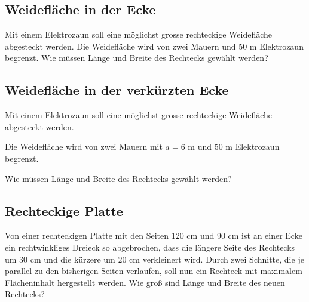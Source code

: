 
\subsection{Weidefläche in der Ecke}

Mit einem Elektrozaun soll eine möglichst grosse rechteckige
Weidefläche abgesteckt werden.
Die Weidefläche wird von zwei Mauern und 50 m
Elektrozaun begrenzt.
Wie
müssen Länge und Breite des Rechtecks gewählt werden?


\subsection{Weidefläche in der verkürzten Ecke}

Mit einem Elektrozaun soll eine möglichst grosse rechteckige
Weidefläche abgesteckt werden.

Die Weidefläche wird von zwei Mauern
mit $a=6 \text{ m}$ und $50 \text{ m}$
Elektrozaun begrenzt.

Wie müssen Länge und Breite des Rechtecks gewählt werden?


\subsection{Rechteckige Platte}
Von einer rechteckigen Platte mit den Seiten 120 cm und 90 cm ist an
einer Ecke ein rechtwinkliges Dreieck so abgebrochen, dass die längere
Seite des Rechtecks um 30 cm und die kürzere um 20 cm verkleinert
wird. Durch zwei Schnitte, die je parallel zu den bisherigen Seiten
verlaufen, soll nun ein Rechteck mit maximalem Flächeninhalt hergestellt werden.
Wie groß sind Länge und Breite des neuen Rechtecks?

